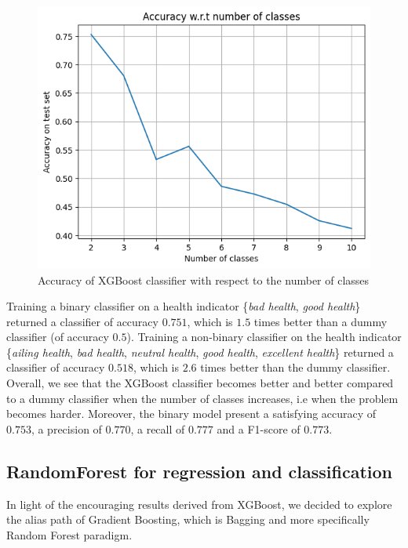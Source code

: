 \documentclass[]{article}
\begin{document}
\begin{figure}[!h]
	\centering
	\includegraphics[scale=0.6]{xgboost_accuracy_wrt_number_of_classes.png}
	\caption{Accuracy of XGBoost classifier with respect to the number of classes}
	\label{xgboost_accuracy}
\end{figure}
\noindent
Training a binary classifier on a health indicator \{\textit{bad health}, \textit{good health}\}
returned a classifier of accuracy $0.751$, which is $1.5$ times better than a dummy classifier (of accuracy $0.5$). Training a non-binary classifier on the health indicator \{\textit{ailing health}, \textit{bad health}, \textit{neutral health}, \textit{good health}, \textit{excellent health}\} returned a classifier of accuracy $0.518$, which is $2.6$ times better than the dummy classifier.\\
Overall, we see that the XGBoost classifier becomes better and better compared to a dummy classifier when the number of classes increases, i.e when the problem becomes harder. Moreover, the binary model present a satisfying accuracy of $0.753$, a precision of $0.770$, a recall of $0.777$ and a F1-score of $0.773$.

\subsection{RandomForest for regression and classification}
In light of the encouraging results derived from XGBoost, we decided to explore the alias path of Gradient Boosting, which is Bagging and more specifically Random Forest \cite{randomForest2012} paradigm.
\end{document}
